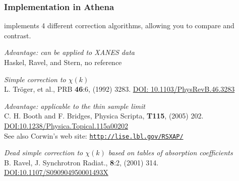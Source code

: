 \documentclass[10pt, xcolor=x11names, compress, handout]{beamer}
\begin{document}
\begin{frame}
  \frametitle{Implementation in Athena}
  \small
  {\athena} implements 4 different correction algorithms, allowing you
  to compare and contrast.

  \medskip

  \begin{description}[Tr\"oger]
  \item[Fluo] \textit{Advantage: can be applied to XANES data}\\
    Haskel, Ravel, and Stern, no reference
  \item[Tr\"oger] \textit{Simple correction to $\chi(k)$}\\L. Tr\"oger, et
    al., PRB \textbf{46}:6, (1992) 3283.
    \href{http://dx.doi.org/10.1103/PhysRevB.46.3283}{\color{Blue2}DOI:
      10.1103/PhysRevB.46.3283}
  \item[Booth] \textit{Advantage: applicable to the thin sample limit}\\
    C. H. Booth and F. Bridges, Physica Scripta, \textbf{T115}, (2005)
    202.  \href{http://dx.doi.org/10.1238/Physica.Topical.115a00202}
    {\color{Blue2}DOI:10.1238/Physica.Topical.115a00202}\\ See also
    Corwin's web site: \href{http://lise.lbl.gov/RSXAP/}
    {\color{Blue2}\texttt{http://lise.lbl.gov/RSXAP/}}
  \item[Atoms] \textit{Dead simple correction to $\chi(k)$ based on
      tables of absorption coefficients}\\
    B. Ravel, J. Synchrotron Radiat., \textbf{8}:2, (2001) 314. 
    \href{http://dx.doi.org/10.1107/S090904950001493X}
    {\color{Blue2}DOI:10.1107/S090904950001493X}
  \end{description}
\end{frame}
\end{document}
